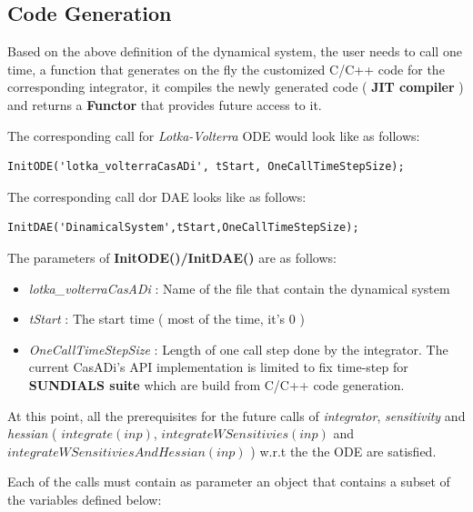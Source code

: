 \documentclass[12pt, letterpaper]{article}
\begin{document}
\subsection{Code Generation}

Based on the above definition of the dynamical system, the user needs to call one time, a function that generates on the fly the customized C/C++ code for the corresponding integrator, it compiles the newly generated code ( \textbf{JIT compiler} ) and returns a \textbf{Functor} that provides future access to it.

The corresponding call for \textit{Lotka-Volterra} ODE would look like as follows:

\begin{lstlisting}
InitODE('lotka_volterraCasADi', tStart, OneCallTimeStepSize);
\end{lstlisting}

The corresponding call dor DAE looks like as follows:
\begin{lstlisting}
InitDAE('DinamicalSystem',tStart,OneCallTimeStepSize);
\end{lstlisting}

The parameters of \textbf{InitODE()/InitDAE()} are as follows: 

\begin{itemize}
	\item \textit{lotka\_volterraCasADi} : Name of the file that contain the dynamical system
	\item \textit{tStart} : The start time ( most of the time, it's $0$ )
	\item \textit{OneCallTimeStepSize} : Length of one call step done by the integrator. The current CasADi's API implementation is limited to fix time-step for \textbf{SUNDIALS suite} which are build from C/C++ code generation.
\end{itemize}


At this point, all the prerequisites for the future calls of \textit{integrator}, \textit{sensitivity} and \textit{hessian} ( $integrate(inp)$, $integrateWSensitivies(inp)$ and \\ $integrateWSensitiviesAndHessian(inp)$ ) w.r.t the the ODE are satisfied. 

Each of the calls must contain as parameter an object that contains a subset of the variables defined below:
\end{document}
